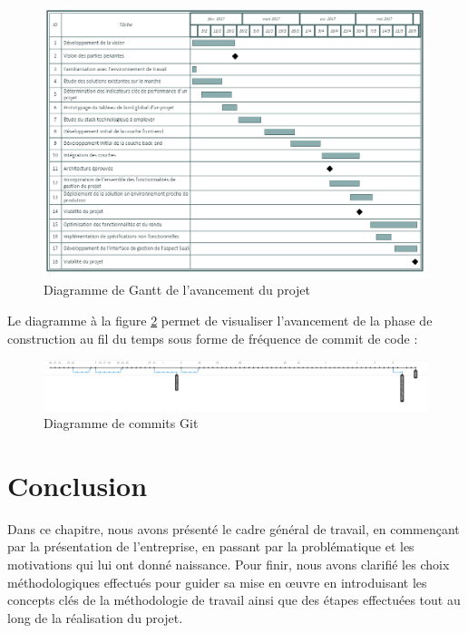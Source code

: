 \begin{spacing}{1.5}
\begin{figure}[h]
\centering
\includegraphics[width=1\linewidth]{gantt.png}
\caption{Diagramme de Gantt de l'avancement du projet}
\label{fig:gantt}
\end{figure}


Le diagramme à la figure \ref{fig:gitFrontEnd} permet de visualiser l'avancement de la phase de construction au fil du temps sous forme de fréquence de commit de code :

\begin{figure}[h]
\centering
\includegraphics[width=1\linewidth]{gitFrontEnd.png}
\caption{Diagramme de commits Git}
\label{fig:gitFrontEnd}
\end{figure}


\section*{Conclusion}
Dans ce chapitre, nous avons présenté le cadre général de travail, en commençant par la présentation de l'entreprise, en passant par la problématique et les motivations qui lui ont donné naissance. Pour finir, nous avons clarifié les choix méthodologiques effectués pour guider sa mise en œuvre en introduisant les concepts clés de la méthodologie de travail ainsi que des étapes effectuées tout au long de la réalisation du projet.


\end{spacing}
